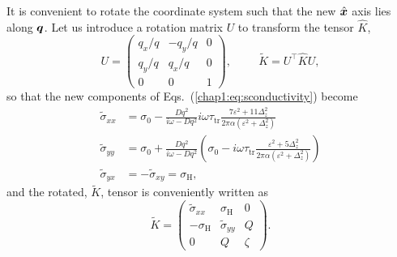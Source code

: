 It is convenient to rotate the coordinate system such that the new $\hat{\boldsymbol{x}}$ axis lies along $\boldsymbol{q}$. Let us introduce a rotation matrix $U$ to transform the tensor $\hat{K}$,  
\begin{equation}
    U = \begin{pmatrix}
            q_x/q & -q_y/q & 0 \\
            q_y/q & q_x/q &0 \\
            0 & 0 & 1
        \end{pmatrix},\hspace{1cm}
    \tilde{K} = U^\top \hat{K} U,
\end{equation}
so that the new components of Eqs.~(\ref{chap1:eq:sconductivity}) become
\beml
\label{chap1:eq:sconductivity2}
\begin{align}
  \tilde{\sigma}_{xx} &= \sigma_0-\frac{Dq^2}{i\omega-Dq^2}i\omega \tau_\text{tr}\frac{7\varepsilon^2+11\Delta_z^2}{2\pi\alpha (\varepsilon^2+\Delta_z^2)}\\
  \tilde{\sigma}_{yy} &= \sigma_0+\frac{Dq^2}{i\omega-Dq^2} \left(\sigma_0-i\omega \tau_\text{tr}\frac{\varepsilon^2+5\Delta_z^2}{2\pi\alpha(\varepsilon^2+\Delta_z^2)}\right)\\
    \tilde{\sigma}_{yx} &= -\tilde{\sigma}_{xy}=\sigma_\textrm{H},
\end{align}
\eml
and the rotated, $\tilde{K}$, tensor is conveniently written as
\begin{equation}
    \tilde{K} = \begin{pmatrix} \tilde{\sigma}_{xx}         & \sigma_\textrm{H} & 0 \\
                                -\sigma_\textrm{H}  & \tilde{\sigma}_{yy}       & Q \\
                                0                   & Q                 & \zeta
                \end{pmatrix}.
\end{equation}

